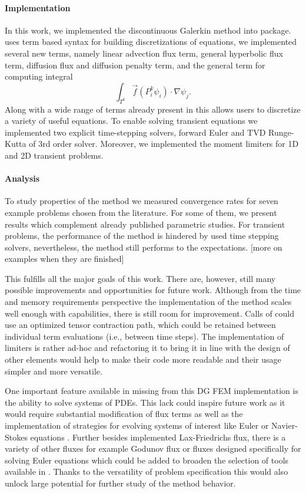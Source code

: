 \paragraph{Implementation}
In this work, we implemented the discontinuous Galerkin method into \sfepy{} 
package. \sfepy{} uses term based syntax for building discretizations of 
equations, we implemented several new terms, namely linear advection flux 
term, general hyperbolic flux term, diffusion flux and diffusion penalty term, 
and the general term for computing integral
$$
\int_{T^k} \vec{f}(P_i^k\psi_i)\cdot\nabla\psi_j. 
$$
Along with a wide range of terms already present in \sfepy{} this allows users 
to discretize a variety of useful equations. To enable solving transient 
equations we implemented two explicit time-stepping solvers, forward Euler and 
TVD Runge-Kutta of 3rd order solver. Moreover, we implemented the moment 
limiters for 1D and 2D transient problems.

\paragraph{Analysis}
To study properties of the method we measured convergence rates for seven 
example problems chosen from the literature. For some of them, we present 
results which complement already published parametric studies. For transient 
problems, the performance of the method is hindered by used time stepping 
solvers, nevertheless, the method still performs to the expectations.
[\todo more on examples when they are finished]

This fulfills all the major goals of this work. There are, however, still many 
possible improvements and opportunities for future work. Although from the 
time and memory requirements perspective the implementation of the method 
scales well enough with \sfepy{} capabilities, there is still room for 
improvement. Calls of  could use an optimized tensor 
contraction path, which could be retained between individual term evaluations 
(i.e., between time steps). The implementation of limiters is rather ad-hoc and 
refactoring it to bring it in line with the design of other \sfepy{} elements 
would help to make their code more readable and their usage simpler and more 
versatile. 

One important feature available in \sfepy{} missing from this DG FEM 
implementation is the ability to solve systems of PDEs. This lack could 
inspire future work as it would require substantial modification of flux terms 
as well as the implementation of  strategies for evolving systems of interest 
like Euler or Navier-Stokes equations \cite{Hesthaven2008}. Further besides 
implemented Lax-Friedrichs flux, there is a variety of other fluxes for 
example Godunov flux \cite{DiPietro2012} or fluxes designed specifically for 
solving Euler equations \cite[Section 3.3]{Kucera} which could be added to 
broaden the selection of tools available in \sfepy{}. Thanks to the versatility of 
problem specification this would also unlock large potential for further study of the 
method behavior.